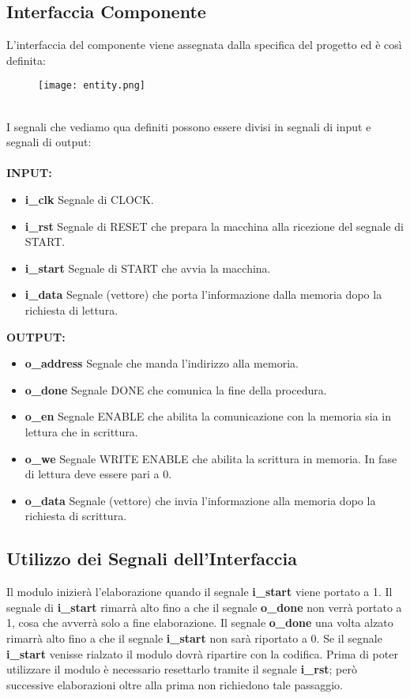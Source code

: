 \documentclass[a4paper]{article}
\begin{document}
\subsection{Interfaccia Componente}
L'interfaccia del componente viene assegnata dalla specifica del progetto ed è così definita:
\begin{figure}[htp]
    \centering
    \texttt{[image: entity.png]}
    \label{fig:interface}
\end{figure}
\\I segnali che vediamo qua definiti possono essere divisi in segnali di input e segnali di output:\\\\
\textbf{INPUT:}
\begin{itemize}
\item \textbf{i\_clk} Segnale di CLOCK.
\item \textbf{i\_rst} Segnale di RESET che prepara la macchina alla ricezione del segnale di START.
\item \textbf{i\_start} Segnale di START che avvia la macchina.
\item \textbf{i\_data} Segnale (vettore) che porta l'informazione dalla memoria dopo la richiesta di lettura.
\end{itemize}
\textbf{OUTPUT:}
\begin{itemize}
\item \textbf{o\_address} Segnale che manda l'indirizzo alla memoria.
\item \textbf{o\_done} Segnale DONE che comunica la fine della procedura.
\item \textbf{o\_en} Segnale ENABLE che abilita la comunicazione con la memoria sia in lettura che in scrittura.
\item \textbf{o\_we} Segnale WRITE ENABLE che abilita la scrittura in memoria. In fase di lettura deve essere pari a 0.
\item \textbf{o\_data} Segnale (vettore) che invia l'informazione alla memoria dopo la richiesta di scrittura.
\end{itemize}
\subsection{Utilizzo dei Segnali dell'Interfaccia}
Il modulo inizierà l'elaborazione quando il segnale \textbf{i\_start} viene portato a 1. Il segnale di \textbf{i\_start} rimarrà alto fino a che il segnale \textbf{o\_done} non verrà portato a 1, cosa che avverrà solo a fine elaborazione. Il segnale \textbf{o\_done} una volta alzato rimarrà alto fino a che il segnale \textbf{i\_start} non sarà riportato a 0. Se il segnale \textbf{i\_start} venisse rialzato il modulo dovrà ripartire con la codifica. 
Prima di poter utilizzare il modulo è necessario resettarlo tramite il segnale \textbf{i\_rst}; però successive elaborazioni oltre alla prima non richiedono tale passaggio.
\end{document}
